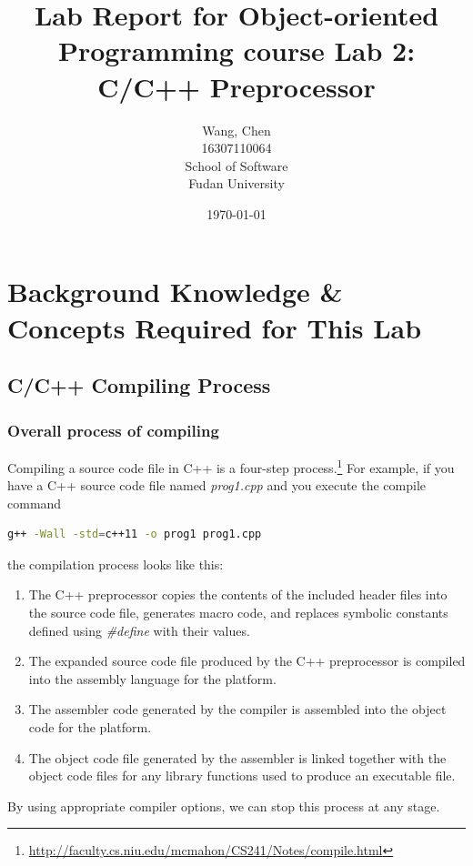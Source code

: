 \documentclass[a4paper]{report}
\title{Lab Report for Object-oriented Programming course \newline
 Lab 2: C/C++ Preprocessor}
\author{Wang, Chen \\ 16307110064 \\ School of Software\\ Fudan University}
\date{\today}
\begin{document}
\maketitle

\tableofcontents

\chapter{Background Knowledge \& Concepts Required for This Lab}
\section{C/C++ Compiling Process}

\subsection{Overall process of compiling}
Compiling a source code file in C++ is a four-step process.\footnote{ \url{http://faculty.cs.niu.edu/mcmahon/CS241/Notes/compile.html}}
 For example, if you have a C++ source code file named \emph{prog1.cpp} and you execute the compile command
 \begin{lstlisting}[language=bash]
g++ -Wall -std=c++11 -o prog1 prog1.cpp
\end{lstlisting}
the compilation process looks like this:
\begin{enumerate}
\item
The C++ preprocessor copies the contents of the included header files into the source code file, generates macro code, and replaces symbolic constants defined using \emph{\#define} with their values.
\item
The expanded source code file produced by the C++ preprocessor is compiled into the assembly language for the platform.
\item
The assembler code generated by the compiler is assembled into the object code for the platform.
\item
The object code file generated by the assembler is linked together with the object code files for any library functions used to produce an executable file.
\end{enumerate}
By using appropriate compiler options, we can stop this process at any stage.
\end{document}
